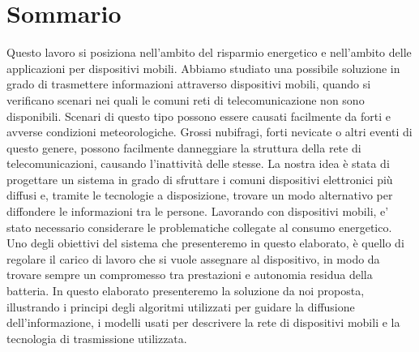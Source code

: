 
\begingroup
\let\clearpage\relax
\let\cleardoublepage\relax
\let\cleardoublepage\relax

\chapter*{Sommario}
Questo lavoro si posiziona nell'ambito del risparmio energetico e nell'ambito delle applicazioni per dispositivi mobili. Abbiamo studiato una possibile soluzione in grado di trasmettere informazioni attraverso dispositivi mobili, quando si verificano scenari nei quali le comuni reti di telecomunicazione non sono disponibili. Scenari di questo tipo possono essere causati facilmente da forti e avverse condizioni meteorologiche. Grossi nubifragi, forti nevicate o altri eventi di questo genere, possono facilmente danneggiare la struttura della rete di telecomunicazioni, causando l'inattività delle stesse. La nostra idea è stata di progettare un sistema in grado di sfruttare i comuni dispositivi elettronici più diffusi e, tramite le tecnologie a disposizione, trovare un modo alternativo per diffondere le informazioni tra le persone. Lavorando con dispositivi mobili, e' stato necessario considerare le problematiche collegate al consumo energetico. Uno degli obiettivi del sistema che presenteremo in questo elaborato, è quello di regolare il carico di lavoro che si vuole assegnare al dispositivo, in modo da trovare sempre un compromesso tra prestazioni e autonomia residua della batteria.
In questo elaborato presenteremo la soluzione da noi proposta, illustrando i principi degli algoritmi utilizzati per guidare la diffusione dell'informazione, i modelli usati per descrivere la rete di dispositivi mobili e la tecnologia di trasmissione utilizzata.
\endgroup
